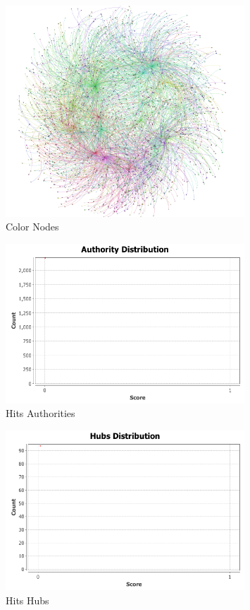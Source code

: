 \documentclass[letterpaper,11pt]{article}
\begin{document}
\begin{figure}[!ht]
\centering
\includegraphics[width=0.8\textwidth]{Q3/3.png}
\caption{Color Nodes}
\label{fig:Color Nodes}
\end{figure}

\begin{figure}[!ht]
\centering
\includegraphics[width=0.8\textwidth]{Q3/Hits/authorities.png}
\caption{Hits Authorities}
\label{fig:Hits Authorities}
\end{figure}

\begin{figure}[!ht]
\centering
\includegraphics[width=0.8\textwidth]{Q3/Hits/hubs.png}
\caption{Hits Hubs}
\label{fig:Hits Hubs}
\end{figure}
\end{document}
